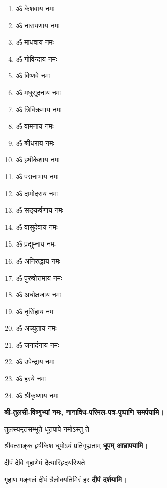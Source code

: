 \begin{center}
\begin{multicols}{2}
\begin{enumerate}
\item ॐ केशवाय नमः
\item ॐ नारायणाय नमः
\item ॐ माधवाय नमः
\item ॐ गोविन्दाय नमः
\item ॐ विष्णवे नमः
\item ॐ मधुसूदनाय नमः
\item ॐ त्रिविक्रमाय नमः
\item ॐ वामनाय नमः
\item ॐ श्रीधराय नमः
\item ॐ हृषीकेशाय नमः
\item ॐ पद्मनाभाय नमः
\item ॐ दामोदराय नमः
\item ॐ सङ्कर्षणाय नमः
\item ॐ वासुदेवाय नमः
\item ॐ प्रद्युम्नाय नमः
\item ॐ अनिरुद्धाय नमः
\item ॐ पुरुषोत्तमाय नमः
\item ॐ अधोक्षजाय नमः
\item ॐ नृसिंहाय नमः
\item ॐ अच्युताय नमः
\item ॐ जनार्दनाय नमः
\item ॐ उपेन्द्राय नमः
\item ॐ हरये नमः
\item ॐ श्रीकृष्णाय नमः
\end{enumerate}
\end{multicols}

\begingroup
\setlength{\columnseprule}{1pt}
\let\chapt\sect


\textbf{श्री-तुलसी-विष्णुभ्यां नमः, नानाविध-परिमल-पत्र-पुष्पाणि समर्पयामि।}
\endgroup



{तुलस्यमृतसम्भूते धूतपापे नमोऽस्तु ते}

{श्रीवत्साङ्क हृषीकेश धूपोऽयं प्रतिगृह्यताम्}
\textbf{\devAya{} धूपम् आघ्रापयामि।}
\medskip

{दीपं देवि गृहाणेमं दैत्यारिहृदयस्थिते}

{गृहाण मङ्गलं दीपं त्रैलोक्यतिमिरं हर}
\textbf{\devAya{} दीपं दर्शयामि।}
\medskip


\end{center}
